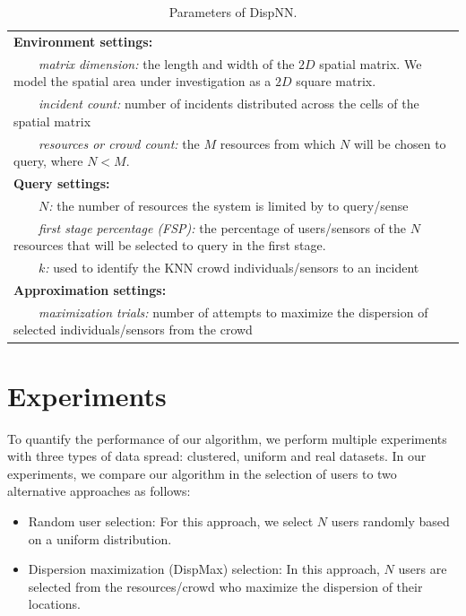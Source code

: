 \documentclass{acm_proc_article-sp}
\newcommand{\tabitem}{~~\llap{\textbullet}~~}
\begin{document}
\begin{table}{}
\centering
\begin{tabulary}{0.5\textwidth}{|L|}
\hline
\textbf{Environment settings:}\\
\tabitem \textit{matrix dimension:} the length and width of the $2D$ spatial matrix. We model the spatial area under investigation as a $2D$ square matrix.\\
\tabitem \textit{incident count:} number of incidents distributed across the cells of the spatial matrix\\
\tabitem \textit{resources or crowd count:} the $M$ resources from which $N$ will be chosen to query, where $N < M$.\\
\hline
\textbf{Query settings:}\\
\tabitem \textit{$N$:} the number of resources the system is limited by to query/sense \\
\tabitem \textit{first stage percentage (FSP):} the percentage of users/sensors of the $N$ resources that will be selected to query in the first stage.\\
\tabitem\textit{$k$:} used to identify the KNN crowd individuals/sensors to an incident\\
\hline
\textbf{Approximation settings: }\\
\tabitem \textit{maximization trials:} number of attempts to maximize the dispersion of selected individuals/sensors from the crowd\\
\hline
\end{tabulary}
\caption{Parameters of DispNN.}
\label{table:systemParameters}
\end{table}

\section{Experiments}
To quantify the performance of our algorithm, we perform multiple experiments with three types of data spread: clustered, uniform and real datasets. In our experiments, we compare our algorithm in the selection of users to two alternative approaches as follows:
\begin{itemize}
\item Random user selection: For this approach, we select $N$ users randomly based on a uniform distribution.
\item Dispersion maximization (DispMax) selection: In this approach, $N$ users are selected from the resources/crowd who maximize the dispersion of their locations.
\end{itemize}
\end{document}
